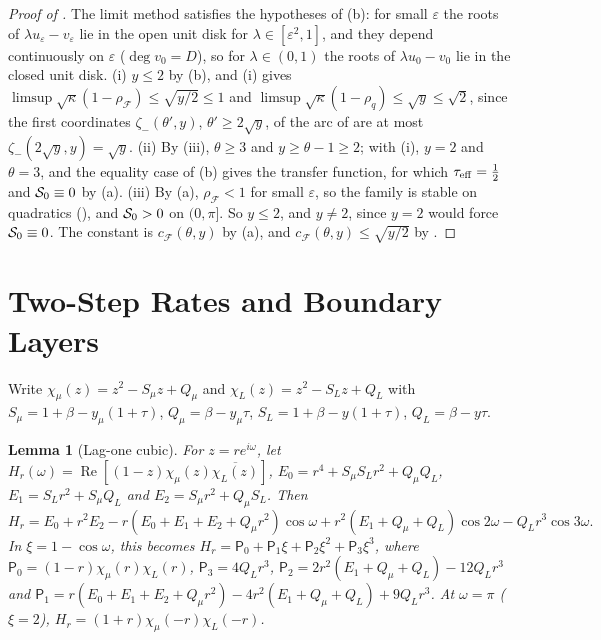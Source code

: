 \documentclass[11pt]{article}
\newtheorem{lemma}[theorem]{Lemma}
\theoremstyle{definition}
\theoremstyle{remark}
\newcommand{\cF}{\mathcal F}
\newcommand{\sfP}{\mathsf P}
\newcommand{\Rea}{\operatorname{Re}}
\newcommand{\rhoF}{\rho_{\cF}}
\newcommand{\cFF}{c_{\cF}}
\newcommand{\teff}{\tau_{\rm eff}}
\begin{document}
\begin{proof}[Proof of ]
The limit method satisfies the hypotheses of (b): for small \(\varepsilon\) the roots of
\(\lambda u_\varepsilon-v_\varepsilon\) lie in the open unit disk for \(\lambda\in[\varepsilon^2,1]\), and they depend continuously on \(\varepsilon\) (\(\deg v_0=D\)),
so for \(\lambda\in(0,1)\) the roots of \(\lambda u_0-v_0\) lie in the closed unit disk.
(i) \(y\le2\) by (b), and (i) gives \(\limsup\sqrt\kappa(1-\rhoF)\le\sqrt{y/2}\le1\) and
\(\limsup\sqrt\kappa(1-\rho_q)\le\sqrt y\le\sqrt2\), since the first coordinates \(\zeta_-(\theta',y)\), \(\theta'\ge2\sqrt y\), of the arc of
 are at most \(\zeta_-(2\sqrt y,y)=\sqrt y\).  (ii) By
(iii), \(\theta\ge3\) and \(y\ge\theta-1\ge2\); with (i), \(y=2\) and \(\theta=3\), and the equality case of
(b) gives the transfer function, for which \(\teff=\frac12\) and \(\mathcal S_0\equiv0\) by (a).  (iii) By
(a), \(\rhoF<1\) for small \(\varepsilon\), so the family is stable on quadratics (), and
\(\mathcal S_0>0\) on \((0,\pi]\).  So \(y\le2\), and \(y\ne2\), since \(y=2\) would force \(\mathcal S_0\equiv0\).  The constant is \(\cFF(\theta,y)\) by
(a), and \(\cFF(\theta,y)\le\sqrt{y/2}\) by .
\end{proof}

%
\section{Two-Step Rates and Boundary Layers}
\label{app:classM}
%

Write \(\chi_\mu(z)=z^2-S_\mu z+Q_\mu\) and \(\chi_L(z)=z^2-S_Lz+Q_L\) with
\(S_\mu=1+\beta-y_\mu(1+\tau)\), \(Q_\mu=\beta-y_\mu\tau\),
\(S_L=1+\beta-y(1+\tau)\), \(Q_L=\beta-y\tau\).

\begin{lemma}[Lag-one cubic]\label{lem:cubic}
For \(z=re^{i\omega}\), let \(H_r(\omega)=\Rea[(1-z)\chi_\mu(z)\overline{\chi_L(z)}]\),
\(E_0=r^4+S_\mu S_Lr^2+Q_\mu Q_L\), \(E_1=S_Lr^2+S_\mu Q_L\) and
\(E_2=S_\mu r^2+Q_\mu S_L\).  Then
\[
H_r=E_0+r^2E_2-r(E_0+E_1+E_2+Q_\mu r^2)\cos\omega+r^2(E_1+Q_\mu+Q_L)\cos2\omega-Q_Lr^3\cos3\omega .
\]
In \(\xi=1-\cos\omega\), this becomes
\(H_r=\sfP_0+\sfP_1\xi+\sfP_2\xi^2+\sfP_3\xi^3\), where
\(\sfP_0=(1-r)\chi_\mu(r)\chi_L(r)\), \(\sfP_3=4Q_Lr^3\),
\(\sfP_2=2r^2(E_1+Q_\mu+Q_L)-12Q_Lr^3\) and
\(\sfP_1=r(E_0+E_1+E_2+Q_\mu r^2)-4r^2(E_1+Q_\mu+Q_L)+9Q_Lr^3\).  At \(\omega=\pi\) (\(\xi=2\)),
\(H_r=(1+r)\chi_\mu(-r)\chi_L(-r)\).
\end{lemma}
\end{document}
